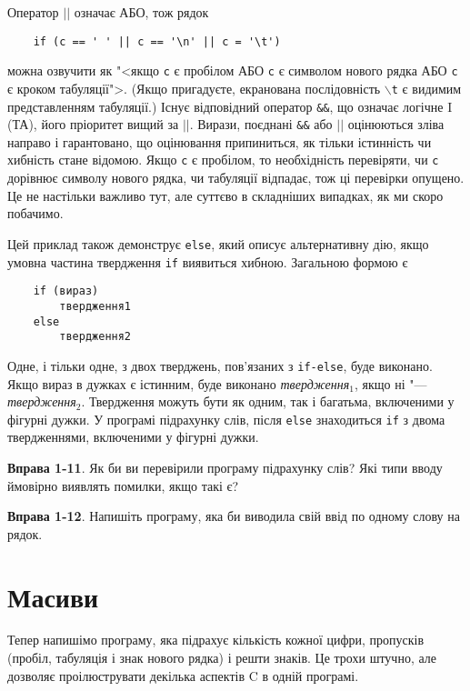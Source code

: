 \documentclass[a4paper,12pt]{book}
\begin{document}
  Оператор \texttt{\mbox{$|$}\mbox{$|$}} означає АБО, тож рядок
  \begin{verbatim}
    if (c == ' ' || c == '\n' || c = '\t')
  \end{verbatim}
  можна озвучити як "<якщо \texttt{c} є пробілом АБО \texttt{c} є символом нового рядка
  АБО \texttt{c} є кроком табуляції">. (Якщо пригадуєте, екранована послідовність
  \texttt{\mbox{$\backslash$}t} є видимим представленням табуляції.) Існує відповідний
  оператор \texttt{\&\&}, що означає логічне I (ТА), його пріоритет вищий за
  \texttt{\mbox{$|$}\mbox{$|$}}. Вирази, поєднані \texttt{\&\&} або
  \texttt{\mbox{$|$}\mbox{$|$}} оцінюються зліва направо і гарантовано, що оцінювання
  припиниться, як тільки істинність чи хибність стане відомою. Якщо \texttt{c} є пробілом,
  то необхідність перевіряти, чи \texttt{c} дорівнює символу нового рядка, чи табуляції
  відпадає, тож ці перевірки опущено. Це не настільки важливо тут, але суттєво в
  складніших випадках, як ми скоро побачимо.

  Цей приклад також демонструє \texttt{else}, який описує альтернативну дію, якщо умовна
  частина твердження \texttt{if} виявиться хибною. Загальною формою є
  \begin{verbatim}
    if (вираз)
        твердження1
    else
        твердження2
  \end{verbatim}

  Одне, і тільки одне, з двох тверджень, пов'язаних з \texttt{if-else}, буде виконано.
  Якщо вираз в дужках є істинним, буде виконано \textit{твердження\(_{1}\)}, якщо ні
  "--- \textit{твердження\(_{2}\)}. Твердження можуть бути як одним, так і багатьма,
  включеними у фігурні дужки. У програмі підрахунку слів, після \texttt{else} знаходиться
  \texttt{if} з двома твердженнями, включеними у фігурні дужки.

  \textbf{Вправа 1-11}. Як би ви перевірили програму підрахунку слів? Які типи вводу
  ймовірно виявлять помилки, якщо такі є?

  \textbf{Вправа 1-12}. Напишіть програму, яка би виводила свій ввід по одному слову на
  рядок.

\section{Масиви}


  Тепер напишімо програму, яка підрахує кількість кожної цифри, пропусків (пробіл,
  табуляція і знак нового рядка) і решти знаків. Це трохи штучно, але дозволяє
  проілюструвати декілька аспектів C в одній програмі.
\end{document}

